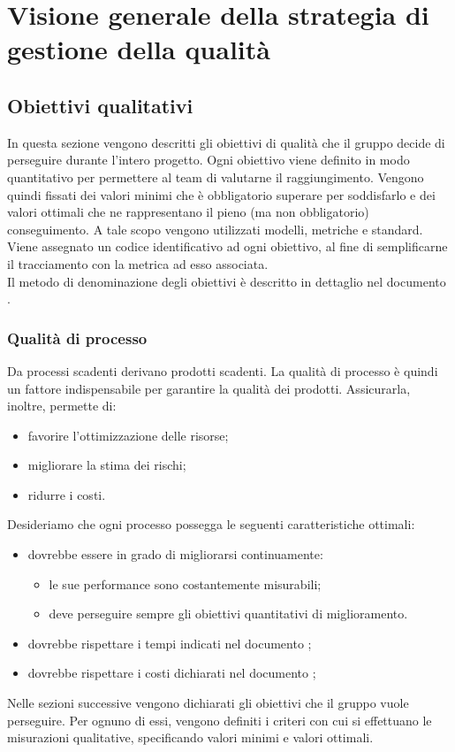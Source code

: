 \documentclass[PianoDiQualifica.tex]{subfiles}
\begin{document}
\section{Visione generale della strategia di gestione della qualità}
	\subsection{Obiettivi qualitativi}
		In questa sezione vengono descritti gli obiettivi di qualità che il gruppo \GRUPPO{} decide di perseguire durante l'intero progetto.
		Ogni obiettivo viene definito in modo quantitativo per permettere al team di valutarne il raggiungimento.
		Vengono quindi fissati dei valori minimi che è obbligatorio superare per soddisfarlo e dei valori ottimali che ne rappresentano il pieno (ma non obbligatorio) conseguimento.
		A tale scopo vengono utilizzati modelli, metriche e standard. \\
		Viene assegnato un codice identificativo ad ogni obiettivo, al fine di semplificarne il tracciamento con la metrica ad esso associata. \\
		Il metodo di denominazione degli obiettivi è descritto in dettaglio nel documento \NPdocRR{}.

		\subsubsection{Qualità di processo}
		Da processi scadenti derivano prodotti scadenti. La qualità di processo è quindi un fattore indispensabile per garantire la qualità dei prodotti. Assicurarla, inoltre, permette di:
		\begin{itemize}
			\item favorire l'ottimizzazione delle risorse;
			\item migliorare la stima dei rischi;
			\item ridurre i costi.
		\end{itemize}
		Desideriamo che ogni processo possegga le seguenti caratteristiche ottimali:
		\begin{itemize}
			\item dovrebbe essere in grado di migliorarsi continuamente:
			\begin{itemize}
					\item le sue performance sono costantemente misurabili;
					\item deve perseguire sempre gli obiettivi quantitativi di miglioramento.
			\end{itemize}
			\item dovrebbe rispettare i tempi indicati nel documento \PPdocRR;
			\item dovrebbe rispettare i costi dichiarati nel documento \PPdocRR;
		\end{itemize}
		Nelle sezioni successive vengono dichiarati gli obiettivi che il gruppo vuole perseguire. Per ognuno di essi, vengono definiti i criteri con cui si effettuano le misurazioni qualitative,
		specificando valori minimi e valori ottimali.
\end{document}
